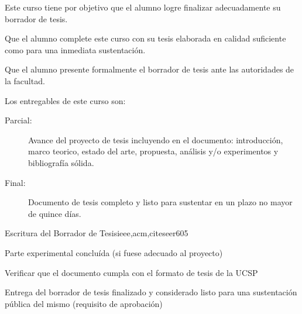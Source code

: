 \begin{syllabus}


\begin{justification}
Este curso tiene por objetivo que el alumno logre finalizar adecuadamente su borrador de tesis.
\end{justification}

\begin{goals}
\item Que el alumno complete este curso con su tesis elaborada en calidad suficiente como para una inmediata sustentación.
\item Que el alumno presente formalmente el borrador de tesis ante las autoridades de la facultad.
\item Los entregables de este curso son:
	\begin{description}
	\item [Parcial:] Avance del proyecto de tesis incluyendo en el documento: introducción, marco teorico, estado del arte, propuesta, análisis y/o experimentos y bibliografía sólida.
	\item [Final:] Documento de tesis completo y listo para sustentar en un plazo no mayor de quince días.
	\end{description}
\end{goals}

\begin{outcomes}
\end{outcomes}

\begin{unit}{Escritura del Borrador de Tesis}{ieee,acm,citeseer}{60}{5}
\begin{learningoutcomes}
      \item Parte experimental concluída (si fuese adecuado al proyecto)
			\item Verificar que el documento cumpla con el formato de tesis de la UCSP 
      \item Entrega del borrador de tesis finalizado y considerado listo para una sustentación pública del mismo (requisito de aprobación)
   \end{learningoutcomes}
\end{unit}



\begin{coursebibliography}

\end{coursebibliography}
\end{syllabus}
